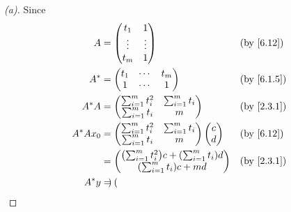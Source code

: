 \begin{proof}[(a)]
  Since
  \begin{align*}
    A         & = \begin{pmatrix}
                    t_1    & 1      \\
                    \vdots & \vdots \\
                    t_m    & 1
                  \end{pmatrix}                                                               &  & \text{(by \cref{6.12})}    \\
    A^*       & = \begin{pmatrix}
                    t_1 & \cdots & t_m \\
                    1   & \cdots & 1
                  \end{pmatrix}                                                            &  & \text{(by \cref{6.1.5})}      \\
    A^* A     & = \begin{pmatrix}
                    \sum_{i = 1}^m t_i^2 & \sum_{i = 1}^m t_i \\
                    \sum_{i = 1}^m t_i   & m
                  \end{pmatrix}                                     &  & \text{(by \cref{2.3.1})}                             \\
    A^* A x_0 & = \begin{pmatrix}
                    \sum_{i = 1}^m t_i^2 & \sum_{i = 1}^m t_i \\
                    \sum_{i = 1}^m t_i   & m
                  \end{pmatrix} \begin{pmatrix}
                                  c \\
                                  d
                                \end{pmatrix}                                     &  & \text{(by \cref{6.12})}                \\
              & = \begin{pmatrix}
                    \pa{\sum_{i = 1}^m t_i^2} c + \pa{\sum_{i = 1}^m t_i} d \\
                    \pa{\sum_{i = 1}^m t_i} c + md
                  \end{pmatrix} &  & \text{(by \cref{2.3.1})}                               \\
    A^* y     & = \begin{pmatrix}

\end{pmatrix}
\end{align*}
\end{proof}
